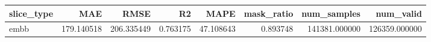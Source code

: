 \begin{tabular}{lrrrrrrr}
\toprule
slice_type & MAE & RMSE & R2 & MAPE & mask_ratio & num_samples & num_valid \\
\midrule
embb & 179.140518 & 206.335449 & 0.763175 & 47.108643 & 0.893748 & 141381.000000 & 126359.000000 \\
\bottomrule
\end{tabular}
